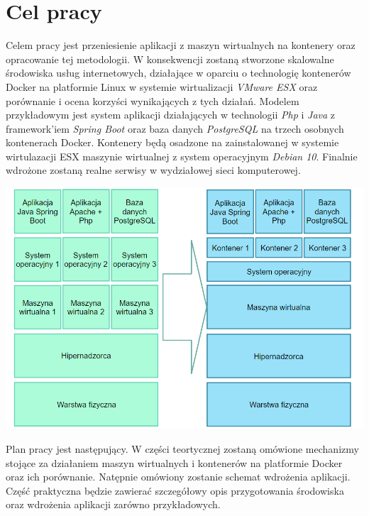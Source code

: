 \documentclass[polish, a4paper, 12pt, oneside]{book}
\begin{document}
\section{Cel pracy}
Celem pracy jest przeniesienie aplikacji z maszyn wirtualnych na kontenery oraz opracowanie tej metodologii. W konsekwencji zostaną stworzone skalowalne środowiska usług internetowych, działające w oparciu o technologię kontenerów Docker na platformie Linux w systemie wirtualizacji \textit{VMware ESX}\cite{vmwareesx} oraz porównanie i ocena korzyści wynikających z tych działań. Modelem przykładowym jest system aplikacji działających w technologii \textit{Php}\cite{php} i \textit{Java}\cite{java} z framework'iem \textit{Spring Boot}\cite{springboot} oraz baza danych \textit{PostgreSQL}\cite{postgresql} na trzech osobnych kontenerach Docker. Kontenery będą osadzone na zainstalowanej w systemie wirtulazacji ESX maszynie wirtualnej z system operacyjnym \textit{Debian 10}\cite{debian10}. Finalnie wdrożone zostaną realne serwisy w wydziałowej sieci komputerowej.\\
\begin{center}
\includegraphics[width=160mm]{schemat_proj.png}
\end{center}

Plan pracy jest następujący. W części teortycznej zostaną omówione mechanizmy stojące za działaniem maszyn wirtualnych i kontenerów na platformie Docker oraz ich porównanie. Natępnie omówiony zostanie schemat wdrożenia aplikacji. Część praktyczna będzie zawierać szczegółowy opis przygotowania środowiska oraz wdrożenia aplikacji zarówno przykładowych. 
\end{document}
